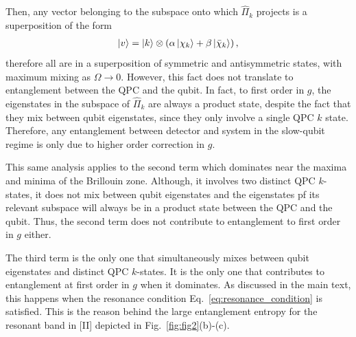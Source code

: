 \documentclass[10pt,
 amsmath,amssymb,
 aps,prb, twocolumn
]{revtex4-2}
\begin{document}
Then, any vector belonging to the subspace onto which \mbox{$\hat{\Pi}_k$} projects is a superposition of the form
\begin{align}
    \ket{v} = \ket{k} \otimes \left(\alpha \ket{\chi_k} + \beta \ket{\bar{\chi}_k}\right),
\end{align}
therefore all are in a superposition of symmetric and antisymmetric states, with maximum mixing as $\Omega\rightarrow 0$. However, this fact does not translate to entanglement between the QPC and the qubit. In fact, to first order in $g$, the eigenstates in the subspace of \mbox{$\hat{\Pi}_k$} are always a product state, despite the fact that they mix between qubit eigenstates, since they only involve a single QPC $k$ state. Therefore, any entanglement between detector and system in the slow-qubit regime is only due to higher order correction in $g$.

This same analysis applies to the second term which dominates near the maxima and minima of the Brillouin zone. Although, it involves two distinct QPC $k$-states, it does not mix between qubit eigenstates and the eigenstates pf its relevant subspace will always be in a product state between the QPC and the qubit. Thus, the second term does not contribute to entanglement to first order in $g$ either.

The third term is the only one that simultaneously mixes between qubit eigenstates and distinct QPC $k$-states. It is the only one that contributes to entanglement at first order in $g$ when it dominates. As discussed in the main text, this happens when the resonance condition Eq.~\eqref{eq:resonance_condition} is satisfied. This is the reason behind the large entanglement entropy for the resonant band in [II] depicted in Fig.~\ref{fig:fig2}(b)-(c).


\end{document}
